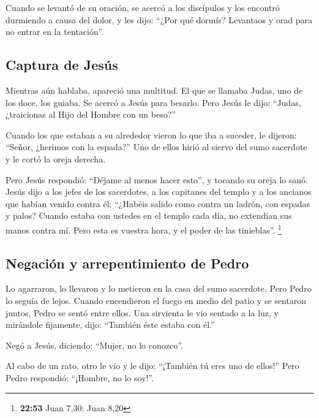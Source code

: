  Cuando se levantó de su oración, se acercó a los
discípulos y los encontró durmiendo a causa del dolor,  y
les dijo: ``¿Por qué dormís? Levantaos y orad para no entrar en la
tentación''.

\hypertarget{captura-de-jesuxfas}{%
\subsection{Captura de Jesús}\label{captura-de-jesuxfas}}

 Mientras aún hablaba, apareció una multitud. El que se
llamaba Judas, uno de los doce, los guiaba. Se acercó a Jesús para
besarlo.  Pero Jesús le dijo: ``Judas, ¿traicionas al
Hijo del Hombre con un beso?''

 Cuando los que estaban a su alrededor vieron lo que iba
a suceder, le dijeron: ``Señor, ¿herimos con la espada?''
 Uno de ellos hirió al siervo del sumo sacerdote y le
cortó la oreja derecha.

 Pero Jesús respondió: ``Déjame al menos hacer esto'', y
tocando su oreja lo sanó.  Jesús dijo a los jefes de los
sacerdotes, a los capitanes del templo y a los ancianos que habían
venido contra él: ``¿Habéis salido como contra un ladrón, con espadas y
palos?  Cuando estaba con ustedes en el templo cada día,
no extendían sus manos contra mí. Pero esta es vuestra hora, y el poder
de las tinieblas''. \footnote{\textbf{22:53} Juan 7,30; Juan 8,20}

\hypertarget{negaciuxf3n-y-arrepentimiento-de-pedro}{%
\subsection{Negación y arrepentimiento de
Pedro}\label{negaciuxf3n-y-arrepentimiento-de-pedro}}

 Lo agarraron, lo llevaron y lo metieron en la casa del
sumo sacerdote. Pero Pedro lo seguía de lejos.  Cuando
encendieron el fuego en medio del patio y se sentaron juntos, Pedro se
sentó entre ellos.  Una sirvienta le vio sentado a la
luz, y mirándole fijamente, dijo: ``También éste estaba con él.''

 Negó a Jesús, diciendo: ``Mujer, no lo conozco''.

 Al cabo de un rato, otro le vio y le dijo: ``¡También tú
eres uno de ellos!'' Pero Pedro respondió: ``¡Hombre, no lo soy!''.

